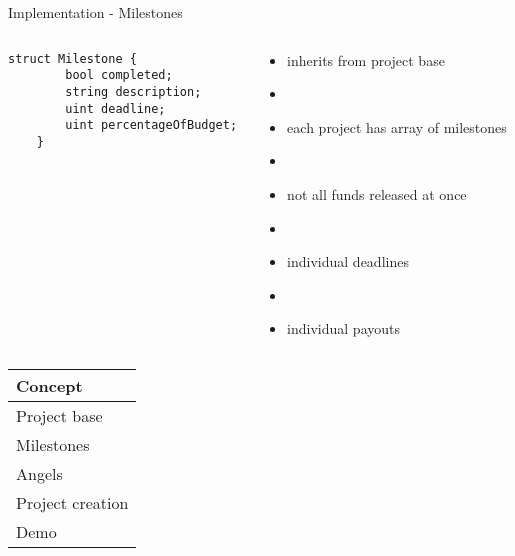 \documentclass{beamer}
\begin{document}
\begin{frame}[fragile]{Implementation - Milestones}
\begin{columns}
\begin{column}{0.4\textwidth}
\centering
\begin{lstlisting}[basicstyle=\tiny]
    struct Milestone {
        bool completed;
        string description;
        uint deadline;
        uint percentageOfBudget;
    }
\end{lstlisting}
\end{column}
\begin{column}{0.6\textwidth}
\centering
	\begin{itemize}
		\item inherits from project base
		\item[]
		\item each project has array of milestones
		\item[]
		\item not all funds released at once
		\item[]
		\item individual deadlines
		\item[]
		\item individual payouts
	\end{itemize}
\end{column}
\end{columns}
\end{frame}





\begin{frame}
	\begin{tabularx}{\textwidth}{X}
		\hline
		Concept\\
		\hline
		Project base\\
		\hline
		Milestones\\
		\hline
		\rowcolor{hcolor}
		Angels\\
		\hline
		Project creation\\
		\hline
		Demo\\
		\hline
	\end{tabularx}
\end{frame}
\end{document}
